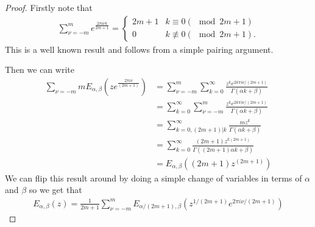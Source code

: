 \begin{proof}
    Firstly note that
    \begin{align}
        \label{eq:sum_identity_1}
        \sum_{\nu=-m}^{m} e^{\frac{2\pi i \nu k}{2m+1}} = 
            \begin{cases}
                2m + 1 & k \equiv 0 (\mod 2m+1) \\
                0 & k \not\equiv 0 (\mod 2m+1).
            \end{cases}
    \end{align}
    This is a well known result and follows from a simple pairing argument.
    
    Then we can write
    \begin{align}
        \sum_{\nu = -m}{m} E_{\alpha,\beta}\left(ze^\frac{2\pi i \nu}{(2m+1)} \right)
            &= \sum_{\nu=-m}^{m} \sum_{k=0}^\infty \frac{z^ke^{2k\pi i\nu / (2m+1)}}{\Gamma(\alpha k + \beta)} \\
            &= \sum_{k=0}^\infty \sum_{\nu=-m}^{m} \frac{z^ke^{2k\pi i\nu / (2m+1)}}{\Gamma(\alpha k + \beta)} \\
            &= \sum_{k=0, (2m + 1) | k}^\infty \frac{mz^k}{\Gamma(\alpha k + \beta)} \\
            &= \sum_{k=0}^\infty \frac{(2m+1)z^{k(2m+1)}}{\Gamma((2m+1)\alpha k + \beta)} \\
            &= E_{\alpha, \beta}((2m+1)z^{(2m+1)})
    \end{align}
    We can flip this result around by doing a simple change of variables in terms of $ \alpha $ and $ \beta $ so we get that
    \begin{align}
        E_{\alpha, \beta}(z) = \frac{1}{2m+1} \sum_{\nu = -m}^{m} E_{\alpha / (2m+1), \beta}\left(z^{1/(2m+1)}e^{2\pi i \nu / (2m+1)}\right)
    \end{align}
\end{proof}

